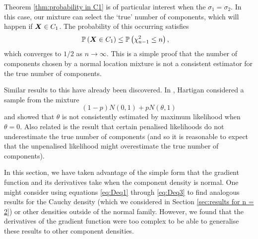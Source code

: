 		Theorem \ref{thm:probability in C1} is of particular interest when the $\sigma_1 = \sigma_2$. In this case, our mixture can select the `true' number of components, which will happen if ${\bm{{X}}} \in C_1$. The probability of this occurring satisfies
		\begin{align}
			\mathbb{P}\left({\bm{{X}}} \in C_1\right) &\leq \mathbb{P}\left(\chi_{n-1}^2 \leq n\right),
		\end{align}
		which converges to $1/2$ as $n \rightarrow \infty$. This is a simple proof that the number of components chosen by a normal location mixture is not a consistent estimator for the true number of components.

		Similar results to this have already been discovered. In \cite{Hartigan1985-wn}, Hartigan considered a sample from the mixture 
		\begin{equation}
			(1 - p)N(0,1) + pN(\theta, 1)
		\end{equation}
		and showed that $\theta$ is not consistently estimated by maximum likelihood when $\theta = 0$.
		Also related is the result \cite{Leroux1992-ek} that certain penalised likelihoods do not underestimate the true number of components (and so it is reasonable to expect that the unpenalised likelihood might overestimate the true number of components).


		In this section, we have taken advantage of the simple form that the gradient function and its derivatives take when the component density is normal. One might consider using equations \eqref{eq:Deq1} through \eqref{eq:Deq3} to find analogous results for the Cauchy density (which we considered in Section \ref{sec:results for n = 2}) or other densities outside of the normal family. However, we found that the derivatives of the gradient function were too complex to be able to generalise these results to other component densities.


